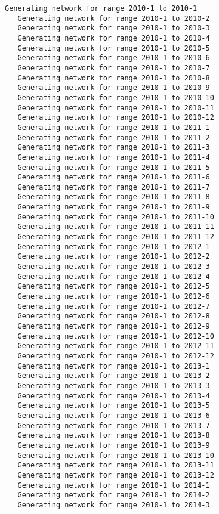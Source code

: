 \documentclass[11pt]{article}
\begin{document}
    \begin{Verbatim}[commandchars=\\\{\}]
   Generating network for range 2010-1 to 2010-1
   Generating network for range 2010-1 to 2010-2
   Generating network for range 2010-1 to 2010-3
   Generating network for range 2010-1 to 2010-4
   Generating network for range 2010-1 to 2010-5
   Generating network for range 2010-1 to 2010-6
   Generating network for range 2010-1 to 2010-7
   Generating network for range 2010-1 to 2010-8
   Generating network for range 2010-1 to 2010-9
   Generating network for range 2010-1 to 2010-10
   Generating network for range 2010-1 to 2010-11
   Generating network for range 2010-1 to 2010-12
   Generating network for range 2010-1 to 2011-1
   Generating network for range 2010-1 to 2011-2
   Generating network for range 2010-1 to 2011-3
   Generating network for range 2010-1 to 2011-4
   Generating network for range 2010-1 to 2011-5
   Generating network for range 2010-1 to 2011-6
   Generating network for range 2010-1 to 2011-7
   Generating network for range 2010-1 to 2011-8
   Generating network for range 2010-1 to 2011-9
   Generating network for range 2010-1 to 2011-10
   Generating network for range 2010-1 to 2011-11
   Generating network for range 2010-1 to 2011-12
   Generating network for range 2010-1 to 2012-1
   Generating network for range 2010-1 to 2012-2
   Generating network for range 2010-1 to 2012-3
   Generating network for range 2010-1 to 2012-4
   Generating network for range 2010-1 to 2012-5
   Generating network for range 2010-1 to 2012-6
   Generating network for range 2010-1 to 2012-7
   Generating network for range 2010-1 to 2012-8
   Generating network for range 2010-1 to 2012-9
   Generating network for range 2010-1 to 2012-10
   Generating network for range 2010-1 to 2012-11
   Generating network for range 2010-1 to 2012-12
   Generating network for range 2010-1 to 2013-1
   Generating network for range 2010-1 to 2013-2
   Generating network for range 2010-1 to 2013-3
   Generating network for range 2010-1 to 2013-4
   Generating network for range 2010-1 to 2013-5
   Generating network for range 2010-1 to 2013-6
   Generating network for range 2010-1 to 2013-7
   Generating network for range 2010-1 to 2013-8
   Generating network for range 2010-1 to 2013-9
   Generating network for range 2010-1 to 2013-10
   Generating network for range 2010-1 to 2013-11
   Generating network for range 2010-1 to 2013-12
   Generating network for range 2010-1 to 2014-1
   Generating network for range 2010-1 to 2014-2
   Generating network for range 2010-1 to 2014-3

\end{Verbatim}
\end{document}
